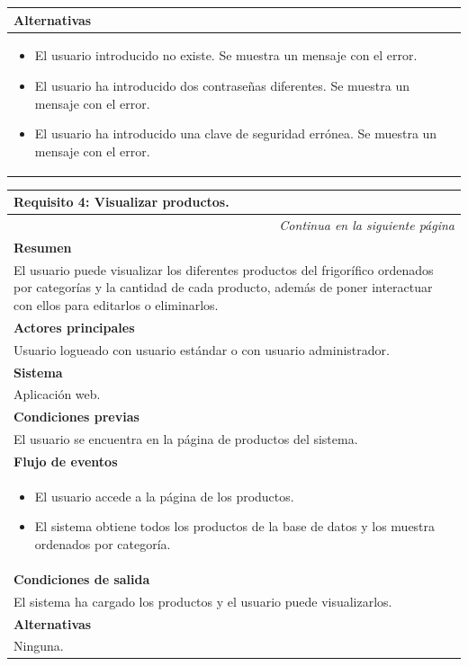 \begin{longtable}{|p{}|}
     \hline
     \rowcolor[gray]{.9}
     \textbf{Alternativas}  \\
     \hline
      \begin{itemize}
         \item El usuario introducido no existe. Se muestra un mensaje con el error.
         \item El usuario ha introducido dos contraseñas diferentes. Se muestra un mensaje con el error.
         \item El usuario ha introducido una clave de seguridad errónea. Se muestra un mensaje con el error.
     \end{itemize} \\
     \hline
\end{longtable}

\begin{longtable}{|p{}|}
\hline
 \rowcolor[gray]{.5}
 \color{white}\textbf{Requisito 4: Visualizar productos.} \\
\hline
\endfirsthead
\endhead
\hline \multicolumn{1}{r}{\textit{Continua en la siguiente página}} \\
\endfoot
\endlastfoot
    \rowcolor[gray]{.9}
     \textbf{Resumen} \\
     \hline
     El usuario puede visualizar los diferentes productos del frigorífico ordenados por categorías y la cantidad de cada producto, además de poner interactuar con ellos para editarlos o eliminarlos. \\
     \hline
     \rowcolor[gray]{.9}
     \textbf{Actores principales} \\
     \hline
     Usuario logueado con usuario estándar o con usuario administrador. \\
     \hline
     \rowcolor[gray]{.9}
     \textbf{Sistema} \\
     \hline
     Aplicación web. \\
     \hline
     \rowcolor[gray]{.9}
     \textbf{Condiciones previas} \\
     \hline
     El usuario se encuentra en la página de productos del sistema. \\
     \hline
     \rowcolor[gray]{.9}
     \textbf{Flujo de eventos}  \\
     \hline
      \begin{itemize}
         \item El usuario accede a la página de los productos.
         \item El sistema obtiene todos los productos de la base de datos y los muestra ordenados por categoría.
     \end{itemize} \\
     \hline
     \rowcolor[gray]{.9}
     \textbf{Condiciones de salida} \\
     \hline
     El sistema ha cargado los productos y el usuario puede visualizarlos. \\
     \hline
     \rowcolor[gray]{.9}
     \textbf{Alternativas}  \\
     \hline
      Ninguna.\\
     \hline
\end{longtable}

